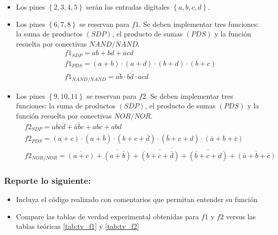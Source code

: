 \begin{itemize}
\begin{table}[H]
    \end{table}
    \item Los pines $\left\lbrace 2,3,4,5\right\rbrace$ serán las entradas digitales $\left\lbrace a,b,c,d\right\rbrace$.
    \item Los pines $\left\lbrace 6,7,8\right\rbrace $ se reservan para $f1$. Se deben implementar tres funciones: la suma de productos $(SDP)$, el producto de sumas $(PDS)$ y la función resuelta por conectivas $NAND/NAND$. 
    \begin{align*}
        &f1_{SDP} = ab + bd + acd\\
        &f1_{PDS} = (a+b)\cdot (a+d)\cdot (b+d)\cdot (b+c)\\
        &f1_{NAND/NAND} = \overline{\overline{ab} \cdot \overline{bd} \cdot \overline{acd}}
    \end{align*}
    \item Los pines $\left\lbrace 9,10,11\right\rbrace $ se reservan para $f2$. Se deben implementar tres funciones: la suma de productos $(SDP)$, el producto de sumas $(PDS)$ y la función resuelta por conectivas $NOR/NOR$.
    \begin{align*}
        &f2_{SDP} = a\bar{b}\bar{c}\bar{d} + \bar{a}\bar{b}c + abc + abd\\
        &f2_{PDS} = (a+c)\cdot (a+\bar{b})\cdot(b+c+\bar{d})\cdot(\bar{b}+c+d)\cdot (\bar{a}+b+\bar{c})\\
        &f2_{NOR/NOR} = \overline{\overline{(a+c)} + \overline{(a+\bar{b})} + \overline{(b+c+\bar{d})} + \overline{(\bar{b}+c+d)} + \overline{(\bar{a}+b+\bar{c})}}
    \end{align*}
\end{itemize}
 
\subsubsection{Reporte lo siguiente:}

\begin{itemize}
    \item Incluya el código realizado con comentarios que permitan entender su función
    \item Compare las tablas de verdad experimental obtenidas para $f1$ y $f2$ versus las tablas teóricas \ref{tab:tv_f1} y \ref{tab:tv_f2}
\end{itemize}


